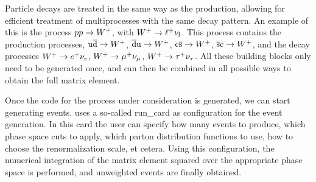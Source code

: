 Particle decays are treated in the same way as the production, allowing for efficient treatment of
multiprocesses with the same decay pattern. An example of this is the process ${p} {p} \rightarrow
W^+$, with $W^+ \rightarrow \ell^+ \nu_l$. This process contains the production
processes, $\mathrm{u} \overline{\mathrm{d}} \rightarrow W^+$, $\overline{\mathrm{d}} \mathrm{u} \rightarrow W^+$, $\mathrm{c} \overline{\mathrm{s}}
\rightarrow W^+$, $\overline{\mathrm{s}} \mathrm{c} \rightarrow W^+$, and the decay processes $W^+ \rightarrow
e^+ \nu_e$, $W^+ \rightarrow \mu^+ \nu_\mu$, $W^+ \rightarrow \tau^+ \nu_\tau$. 
All these building blocks only need to be generated once, and can then be combined in all possible
ways to obtain the full matrix element.  
 
Once the code for the process under consideration is generated, we can start generating events.
\MADGRAPH uses a so-called run\_card as configuration for the event generation. In this card the
user can specify how many events to produce, which phase space cuts to apply, which parton
distribution functions to use, how to choose the renormalization scale, et cetera. Using this
configuration, the numerical integration of the matrix element squared over the appropriate phase
space is performed, and unweighted events are finally obtained. 

